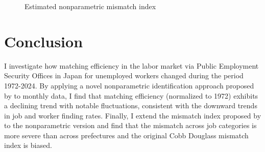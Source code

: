 \documentclass[12pt]{article}
\begin{document}
\begin{figure}[!ht]
  \begin{center}
  \caption{Estimated nonparametric mismatch index}
  \label{fg:mismatch_part_and_full_time_monthly_prefecture} 
  \end{center}
  \footnotesize
\end{figure} 

  

\section{Conclusion}

I investigate how matching efficiency in the labor market via Public Employment Security Offices in Japan for unemployed workers changed during the period 1972-2024. By applying a novel nonparametric identification approach proposed by \cite{lange2020beyond} to monthly data, I find that matching efficiency (normalized to 1972) exhibits a declining trend with notable fluctuations, consistent with the downward trends in job and worker finding rates. 
Finally, I extend the mismatch index proposed by \cite{csahin2014mismatch} to the nonparametric version and find that the mismatch across job categories is more severe than across prefectures and the original Cobb Douglass mismatch index is biased.
\end{document}
